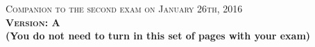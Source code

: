 \documentclass{docist}
\begin{document}
\thispagestyle{empty}

\begin{center}
  {\Large \textsc{Companion to the second exam on January 26th, 2016\\[2ex]
  \textbf{Version: A}\\[2ex]}}
  {\normalsize  \textbf{(You do not need to turn in this set of pages with your exam)}}
\end{center}




\qArchitectureInfluenceCycleTwo


\qRequirementsTwo


\qArchitectureDefinitionTwo


\qAdventureBuilderTwo


\qModuleComponentTwo


\qScenariosTacticsTwo


\qAvailabilityTwo


\qModifiabilityTwoOne


\qNginxScenariosTacticsTwo


\qPerformanceTwoOne


\qDesigningArchitectureTwo


\qContinousIntegrationScenariosTacticsTwo


\qInfinispanScenariosTacticsTwo


\qModuleViewtypeTwoOne


\qUsesGeneralizationTwo

\end{document}
